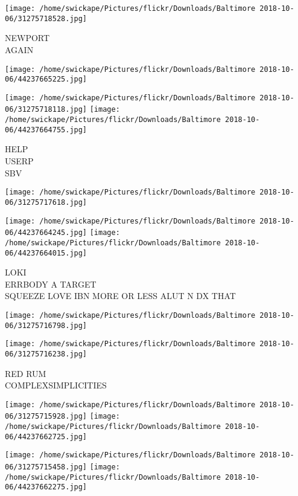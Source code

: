 \documentclass[10pt,letterpaper]{article}
\begin{document}
\vspace{0.25in}
\texttt{[image: /home/swickape/Pictures/flickr/Downloads/Baltimore 2018-10-06/31275718528.jpg]}

NEWPORT\\
AGAIN\\
\pagebreak

\texttt{[image: /home/swickape/Pictures/flickr/Downloads/Baltimore 2018-10-06/44237665225.jpg]}

\vspace{0.25in}
\texttt{[image: /home/swickape/Pictures/flickr/Downloads/Baltimore 2018-10-06/31275718118.jpg]}
\texttt{[image: /home/swickape/Pictures/flickr/Downloads/Baltimore 2018-10-06/44237664755.jpg]}

HELP\\
USERP\\
SBV\\
\pagebreak

\texttt{[image: /home/swickape/Pictures/flickr/Downloads/Baltimore 2018-10-06/31275717618.jpg]}

\vspace{0.25in}
\texttt{[image: /home/swickape/Pictures/flickr/Downloads/Baltimore 2018-10-06/44237664245.jpg]}
\texttt{[image: /home/swickape/Pictures/flickr/Downloads/Baltimore 2018-10-06/44237664015.jpg]}

LOKI\\
ERRBODY A TARGET\\
SQUEEZE LOVE IBN MORE OR LESS ALUT N DX THAT\\
\pagebreak

\texttt{[image: /home/swickape/Pictures/flickr/Downloads/Baltimore 2018-10-06/31275716798.jpg]}

\vspace{0.25in}
\texttt{[image: /home/swickape/Pictures/flickr/Downloads/Baltimore 2018-10-06/31275716238.jpg]}

RED RUM\\
COMPLEXSIMPLICITIES\\
\pagebreak

\texttt{[image: /home/swickape/Pictures/flickr/Downloads/Baltimore 2018-10-06/31275715928.jpg]}
\texttt{[image: /home/swickape/Pictures/flickr/Downloads/Baltimore 2018-10-06/44237662725.jpg]}

\texttt{[image: /home/swickape/Pictures/flickr/Downloads/Baltimore 2018-10-06/31275715458.jpg]}
\texttt{[image: /home/swickape/Pictures/flickr/Downloads/Baltimore 2018-10-06/44237662275.jpg]}
\end{document}
